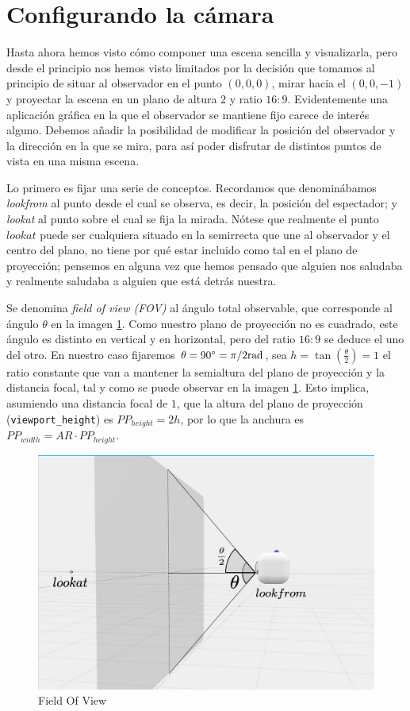 \section{Configurando la cámara}
\label{section:camara}

Hasta ahora hemos visto cómo componer una escena sencilla y visualizarla, pero desde el principio nos hemos visto limitados por la decisión que tomamos al principio de situar al observador en el punto $(0,0,0)$, mirar hacia el $(0,0,-1)$ y proyectar la escena en un plano de altura $2$ y ratio $16:9$. Evidentemente una aplicación gráfica en la que el observador se mantiene fijo carece de interés alguno. Debemos añadir la posibilidad de modificar la posición del observador y la dirección en la que se mira, para así poder disfrutar de distintos puntos de vista en una misma escena.

Lo primero es fijar una serie de conceptos. Recordamos que denominábamos \textit{lookfrom} al punto desde el cual se observa, es decir, la posición del espectador; y \textit{lookat} al punto sobre el cual se fija la mirada. Nótese que realmente el punto $lookat$ puede ser cualquiera situado en la semirrecta que une al observador y el centro del plano, no tiene por qué estar incluido como tal en el plano de proyección; pensemos en alguna vez que hemos pensado que alguien nos saludaba y realmente saludaba a alguien que está detrás nuestra.

Se denomina \textit{field of view (FOV)} al ángulo total observable, que corresponde al ángulo $\theta$ en la imagen \ref{fig:fov}. Como nuestro plano de proyección no es cuadrado, este ángulo es distinto en vertical y en horizontal, pero del ratio $16:9$ se deduce el uno del otro. En nuestro caso fijaremos $\theta=90^\circ=\pi/2 \mathrm{rad}$, sea $h=\tan\left(\frac \theta 2\right)=1$ el ratio constante que van a mantener la semialtura del plano de proyección y la distancia focal, tal y como se puede observar en la imagen \ref{fig:fov}. Esto implica, asumiendo una distancia focal de $1$, que la altura del plano de proyección (\verb|viewport_height|) es $PP_{height}=2h$, por lo que la anchura es $PP_{width}=AR\cdot PP_{height}$. 

\begin{figure} [ht]
    \centering
    \includegraphics[scale = 0.25]{img/C7/fov.png}
    \caption{Field Of View}
    \label{fig:fov}
\end{figure}

